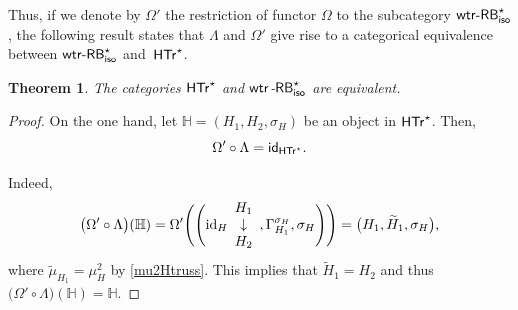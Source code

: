 \documentclass[10pt,a4paper]{amsart}
\numberwithin{equation}{section}
\newtheorem{Theorem}{Theorem}[section]
\begin{document}
Thus, if we denote by $\Omega'$ the restriction of functor $\Omega$ to the subcategory ${\sf wtr}\textnormal{-}{\sf RB}^{\star}_{{\sf iso}}$, the following result states that $\Lambda$ and $\Omega'$ give rise to a categorical equivalence between ${\sf wtr}\textnormal{-}{\sf RB}^{\star}_{{\sf iso}}$ and~${\sf HTr}^{\star}$.
\begin{Theorem}\label{catequivHTr}
The categories $\sf{HTr}^{\star}$ and ${\sf wtr}$-${\sf RB}^{\star}_{{\sf iso}}$ are equivalent.
\end{Theorem}
\begin{proof}On the one hand, let $\mathbb{H}=(H_{1},H_{2},\sigma_{H})$ be an object in $\sf{HTr}^{\star}$. Then,
\[\Omega'\circ\Lambda={\sf id}_{\sf{HTr}^{\star}}.\]

Indeed,
\begin{align*}
\bigl(\Omega'\circ\Lambda\bigr)(\mathbb{H})=\Omega'\Biggl(\Biggl({\rm id}_{H}\begin{array}{c}H_{1}\\\downarrow\\H_{2}\end{array},\Gamma_{H_{1}}^{\sigma_{H}},\sigma_{H}\Biggr)\Biggr)=\bigl(H_{1},\widetilde{H}_{1},\sigma_{H}\bigr),
\end{align*}
where $\widetilde{\mu}_{H_{1}}=\mu_{H}^{2}$ by \eqref{mu2Htruss}. This implies that $\widetilde{H}_{1}=H_{2}$ and thus $\bigl(\Omega'\circ\Lambda\bigr)(\mathbb{H})=\mathbb{H}$.


\end{proof}
\end{document}
